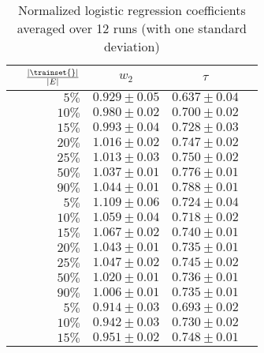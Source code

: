 %
\begin{longtable}{lrccc}
\caption{Normalized logistic regression coefficients averaged over 12 runs (with one standard
  deviation) \label{tab:coeff}}\\
\toprule
                        & $\frac{|\trainset{}|}{|E|}$ & $w_2$            & $\tau$           \\
\midrule
\multirow{5}{*}{\aut{}} & $5\%$                       & $0.929 \pm 0.05$ & $0.637 \pm 0.04$ \\
                        & $10\%$                      & $0.980 \pm 0.02$ & $0.700 \pm 0.02$ \\
                        & $15\%$                      & $0.993 \pm 0.04$ & $0.728 \pm 0.03$ \\
                        & $20\%$                      & $1.016 \pm 0.02$ & $0.747 \pm 0.02$ \\
                        & $25\%$                      & $1.013 \pm 0.03$ & $0.750 \pm 0.02$ \\
                        & $50\%$                      & $1.037 \pm 0.01$ & $0.776 \pm 0.01$ \\
                        & $90\%$                      & $1.044 \pm 0.01$ & $0.788 \pm 0.01$ \\
\midrule
\multirow{5}{*}{\adv{}} & $5\%$                       & $1.109 \pm 0.06$ & $0.724 \pm 0.04$ \\
                        & $10\%$                      & $1.059 \pm 0.04$ & $0.718 \pm 0.02$ \\
                        & $15\%$                      & $1.067 \pm 0.02$ & $0.740 \pm 0.01$ \\
                        & $20\%$                      & $1.043 \pm 0.01$ & $0.735 \pm 0.01$ \\
                        & $25\%$                      & $1.047 \pm 0.02$ & $0.745 \pm 0.02$ \\
                        & $50\%$                      & $1.020 \pm 0.01$ & $0.736 \pm 0.01$ \\
                        & $90\%$                      & $1.006 \pm 0.01$ & $0.735 \pm 0.01$ \\
\midrule
\multirow{5}{*}{\wik{}} & $5\%$                       & $0.914 \pm 0.03$ & $0.693 \pm 0.02$ \\
                        & $10\%$                      & $0.942 \pm 0.03$ & $0.730 \pm 0.02$ \\
                        & $15\%$                      & $0.951 \pm 0.02$ & $0.748 \pm 0.01$ \\

\end{longtable}
